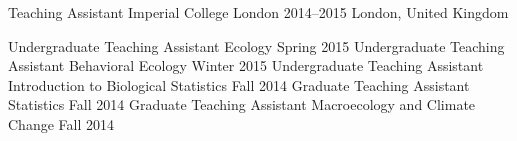 \begin{cventries}
 \cventry
    {Teaching Assistant} %
    {Imperial College London} %
    {2014--2015} %
    {London, United Kingdom} %
    {
      \begin{cvsubentries}
       \cvsubentry
         {Undergraduate Teaching Assistant}
         {\footnotesize Ecology}
         {Spring 2015}
         {
         }
       \cvsubentry
         {Undergraduate Teaching Assistant}
         {\footnotesize Behavioral Ecology}
         {Winter 2015}
         {
         }
       \cvsubentry
         {Undergraduate Teaching Assistant}
         {\footnotesize Introduction to Biological Statistics}
         {Fall 2014}
         {
         }
       \cvsubentry
        {Graduate Teaching Assistant}
        {\footnotesize Statistics}
        {Fall 2014}
        {
        }  
       \cvsubentry
        {Graduate Teaching Assistant}
        {\footnotesize Macroecology and Climate Change}
        {Fall 2014}
        {
        }   
      \end{cvsubentries}
    }
\end{cventries}
